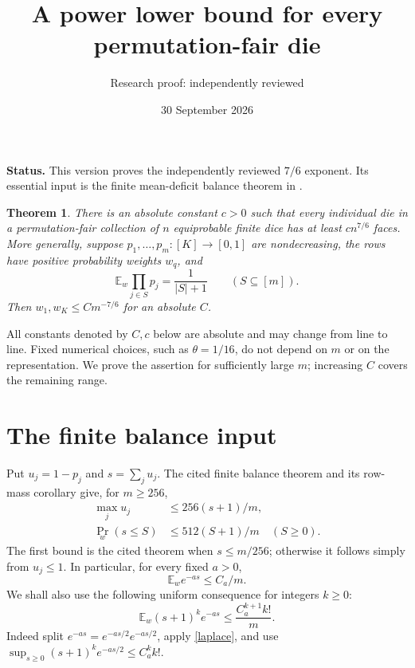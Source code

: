 \documentclass[11pt]{article}
\title{A power lower bound for every permutation-fair die}
\author{Research proof: independently reviewed}
\date{30 September 2026}
\newtheorem{theorem}{Theorem}
\newcommand{\E}{\mathbb E}
\begin{document}
\maketitle
\noindent\textbf{Status.} This version proves the independently reviewed $7/6$ exponent.
Its essential input is the finite mean-deficit balance
theorem in
.

\begin{theorem}\label{main}
There is an absolute constant $c>0$ such that every individual die in
a permutation-fair collection of $n$ equiprobable finite dice has at
least $c n^{7/6}$ faces.
More generally, suppose $p_1,\ldots,p_m:[K]\to[0,1]$ are nondecreasing,
the rows have positive probability weights $w_q$, and
\[
 \E_w\prod_{j\in S}p_j=\frac1{|S|+1}\qquad(S\subseteq[m]).
\]
Then $w_1,w_K\le C m^{-7/6}$ for an absolute $C$.
\end{theorem}

All constants denoted by $C,c$ below are absolute and may change from
line to line. Fixed numerical choices, such as $\theta=1/16$, do not
depend on $m$ or on the representation. We prove the assertion for
sufficiently large $m$; increasing $C$ covers the remaining range.

\section*{The finite balance input}
Put $u_j=1-p_j$ and $s=\sum_j u_j$. The cited finite balance theorem
and its row-mass corollary give, for $m\ge256$,
\begin{align}
 \max_j u_j&\le256(s+1)/m,                    \label{balance}\\
 \Pr_w(s\le S)&\le512(S+1)/m\quad(S\ge0).          \label{mass}
\end{align}
The first bound is the cited theorem when $s\le m/256$; otherwise
it follows simply from $u_j\le1$. In particular, for every fixed $a>0$,
\begin{equation}\label{laplace}
 \E_w e^{-as}\le C_a/m.
\end{equation}
We shall also use the following uniform consequence for integers $k\ge0$:
\begin{equation}\label{weightedmoments}
 \E_w (s+1)^k e^{-as}\le \frac{C_a^{k+1}k!}{m}.
\end{equation}
Indeed split $e^{-as}=e^{-as/2}e^{-as/2}$, apply \eqref{laplace}, and
use $\sup_{s\ge0}(s+1)^k e^{-as/2}\le C_a^k k!$.
\end{document}
